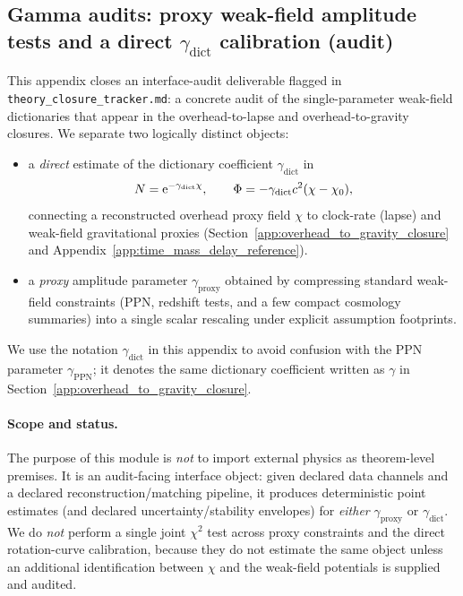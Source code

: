 \subsection[Gamma audits]{Gamma audits: proxy weak-field amplitude tests and a direct $\gamma_{\mathrm{dict}}$ calibration (audit)}
\label{app:gamma_crossobs_consistency}

This appendix closes an interface-audit deliverable flagged in \texttt{theory\_closure\_tracker.md}:
a concrete audit of the single-parameter weak-field dictionaries that appear in the overhead-to-lapse and overhead-to-gravity closures.
We separate two logically distinct objects:
\begin{itemize}
\item a \emph{direct} estimate of the dictionary coefficient $\gamma_{\mathrm{dict}}$ in
\[
N=\mathrm{e}^{-\gamma_{\mathrm{dict}}\chi},\qquad
\Phi=-\gamma_{\mathrm{dict}} c^2(\chi-\chi_0),
\]
connecting a reconstructed overhead proxy field $\chi$ to clock-rate (lapse) and weak-field gravitational proxies
(Section~\ref{app:overhead_to_gravity_closure} and Appendix~\ref{app:time_mass_delay_reference}).
\item a \emph{proxy} amplitude parameter $\gamma_{\mathrm{proxy}}$ obtained by compressing standard weak-field constraints
(PPN, redshift tests, and a few compact cosmology summaries) into a single scalar rescaling under explicit assumption footprints.
\end{itemize}
\AuditTag We use the notation $\gamma_{\mathrm{dict}}$ in this appendix to avoid confusion with the PPN parameter $\gamma_{\mathrm{PPN}}$; it denotes the same dictionary coefficient written as $\gamma$ in Section~\ref{app:overhead_to_gravity_closure}.

\paragraph{Scope and status.}
\InterfaceTag The purpose of this module is \emph{not} to import external physics as theorem-level premises.
It is an audit-facing interface object: given declared data channels and a declared reconstruction/matching pipeline,
it produces deterministic point estimates (and declared uncertainty/stability envelopes) for \emph{either} $\gamma_{\mathrm{proxy}}$ or $\gamma_{\mathrm{dict}}$.
\AuditTag We do \emph{not} perform a single joint $\chi^2$ test across proxy constraints and the direct rotation-curve calibration, because they do not estimate the same object unless an additional identification between $\chi$ and the weak-field potentials is supplied and audited.

